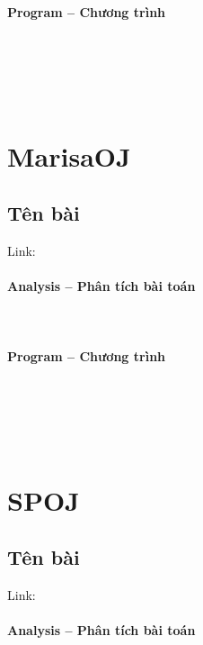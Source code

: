 \documentclass{article}
\begin{document}
\paragraph{Program -- Chương trình} \mbox{} \\


\begin{lstlisting}

	
\end{lstlisting}

\section{MarisaOJ}

\subsection{Tên bài}
Link: \url{}
 

\paragraph{Analysis -- Phân tích bài toán} \mbox{} \\


\paragraph{Program -- Chương trình} \mbox{} \\


\begin{lstlisting}

	
\end{lstlisting}

\section{SPOJ}

\subsection{Tên bài}
Link: \url{}
 

\paragraph{Analysis -- Phân tích bài toán} \mbox{} \\
\end{document}
